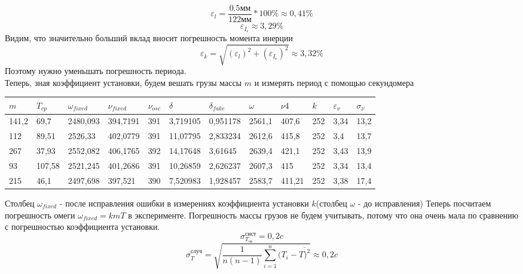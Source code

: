 \documentclass[a4paper,12pt]{article}
\begin{document}
	\begin{equation}
		\varepsilon_{l}=\frac{0.5 \text{мм}}{122 \text{мм}}*100\%\approx 0,41\%
	\end{equation}
	\begin{equation}
		\varepsilon_{I_\text{г}}\approx 3,29\%
	\end{equation}
	Видим, что значительно больший вклад вносит погрешность момента инерции
	\begin{equation}
		\varepsilon_{k}=\sqrt{(\varepsilon_{l})^2 + (\varepsilon_{I_\text{г}})^2} \approx 3,32\%
	\end{equation}
	Поэтому нужно уменьшать погрешность периода.\\
	Теперь, зная коэффициент установки, будем вешать грузы массы $m$ и измерять период с помощью секундомера\\
	\begin{table}[]
		\centering
		\begin{tabular}{|l|l|l|l|l|l|l|l|l|l|l|l|}
			\hline
			$m$     & $T_{cp} $     & $\omega_{fixed}$  & $\nu_{fixed} $ & $\nu_{osc}$ & $\delta$    & $\delta_{fake}$ & $\omega$      & $\nu4$      & $k$   & $\varepsilon_{\nu}$ & $\sigma_{\nu}$ \\ \hline
			141,2 & 69,7   & 2480,093 & 394,7191 & 391   & 3,719105 & 0,951178 & 2561,1 & 407,6  & 252 & 3,34 & 13,2       \\ \hline
			112   & 89,51  & 2526,33  & 402,0779 & 391   & 11,07795 & 2,833234 & 2612,6 & 415,8  & 252 & 3,4 & 13,7     \\ \hline
			267   & 37,93  & 2552,082 & 406,1765 & 392   & 14,17648 & 3,61645  & 2639,4 & 421,1  & 252 & 3,43 & 13,9      \\ \hline
			93    & 107,58 & 2521,245 & 401,2686 & 391   & 10,26859 & 2,626237 & 2607,3 & 415    & 252 & 3,34 & 13,4      \\ \hline
			215   & 46,1   & 2497,698 & 397,521  & 390   & 7,520983 & 1,928457 & 2583,7 & 411,21 & 252 & 3,38 & 17,4     \\ \hline
		\end{tabular}
	\end{table}
	
	Столбец $\omega_{fixed}$ - после исправления ошибки в измерениях коэффициента установки $k$(столбец $\omega$ - до исправления)
	Теперь посчитаем погрешность омеги $\omega_{fixed} = kmT $ в эксперименте. Погрешность массы грузов не будем учитывать, потому что она очень мала по сравнению с погрешностью коэффициента установки.
	\begin{equation}
		\sigma_{T_{\text{ср}}}^\text{сист}=0,2 c
	\end{equation}
	\begin{equation}
		\sigma_{T}^\text{случ}=\sqrt{\frac{1}{n(n-1)} \sum_{i=1}^{n}(T_{i} - \overline{T)^2}}\approx 0,2 c
	\end{equation}
	
\end{document}
